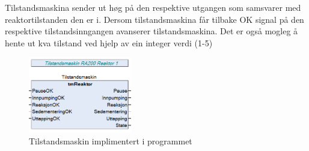 Tilstandsmaskina sender ut høg på den respektive utgangen som samsvarer med reaktortilstanden den er i. Dersom tilstandsmaskina får tilbake
OK signal på den respektive tilstandsinngangen avanserer tilstandsmaskina.
Det er også mogleg å hente ut kva tilstand ved hjelp av ein integer verdi (1-5)

\begin{figure}[htbp]
    \centering
    \includegraphics[width=0.4\textwidth]{Bilder/Tilstandsmaskin.png}
    \caption{Tilstandsmaskin implimentert i programmet}\label{fig:reaktorsoner}
\end{figure}



